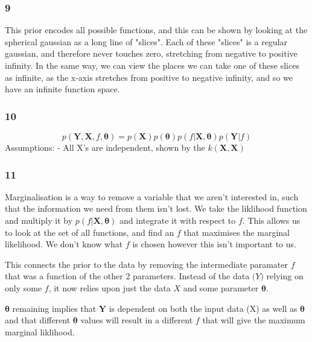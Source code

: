 \documentclass[11pt]{article}
\begin{document}
    \subsubsection*{9}\label{section}

This prior encodes all possible functions, and this can be shown by
looking at the spherical gaussian as a long line of "slices". Each of
these "slices" is a regular gaussian, and therefore never touches zero,
stretching from negative to positive infinity. In the same way, we can
view the places we can take one of these slices as infinite, as the
x-axis stretches from positive to negative infinity, and so we have an
infinite function space.

    \subsubsection*{10}\label{section}
\begin{center}
\end{center}
\[p(\boldsymbol{Y}, \boldsymbol{X}, f, \boldsymbol{\theta}) = p(\boldsymbol{X}) p(\boldsymbol{\theta}) p(f|\boldsymbol{X},\boldsymbol{\theta})p(\boldsymbol{Y}|f)\]
Assumptions: - All X's are independent, shown by the
\(k(\pmb X, \pmb X)\)

    \subsubsection*{11}\label{section}

Marginalisation is a way to remove a variable that we aren't interested
in, such that the information we need from them isn't lost. We take the
liklihood function and multiply it by
\(p(f|\boldsymbol{X},\boldsymbol{\theta})\) and integrate it with
respect to \(f\). This allows us to look at the set of all functions,
and find an \(f\) that maximises the marginal likelihood. We don't know
what \(f\) is chosen however this isn't important to us.

This connects the prior to the data by removing the intermediate
paramater \(f\) that was a function of the other 2 parameters. Instead
of the data \(\boldsymbol(Y)\) relying on only some \(f\), it now relies
upon just the data \(X\) and some parameter \(\boldsymbol{\theta}\).

\(\boldsymbol{\theta}\) remaining implies that \(\boldsymbol{Y}\) is
dependent on both the input data (X) as well as \(\boldsymbol{\theta}\)
and that different \(\boldsymbol{\theta}\) values will result in a
different \(f\) that will give the maximum marginal liklihood.
\end{document}
